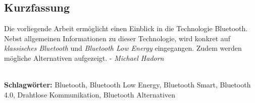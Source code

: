
\subsection*{Kurzfassung}
Die vorliegende Arbeit ermöglicht einen Einblick in die Technologie Bluetooth.
Nebst allgemeinen Informationen zu dieser Technologie, wird konkret auf \textit{klassisches Bluetooth} und \textit{Bluetooth Low Energy} eingegangen.
Zudem werden mögliche Alternativen aufgezeigt.
 - \textit{Michael Hadorn}


%
\mbox{}\\[0.5\baselineskip]\noindent
\textbf{Schlagwörter:} 
Bluetooth, Bluetooth Low Energy, Bluetooth Smart, Bluetooth 4.0, Drahtlose Kommunikation, Bluetooth Alternativen
